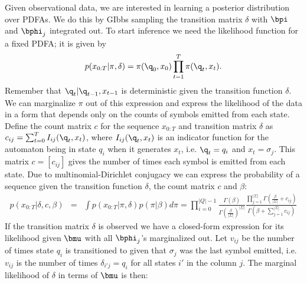 Given observational data, we are interested in learning a posterior distribution over PDFAs.  We do this by GIbbs sampling the transition matrix $\delta$ with $\bpi$ and $\bphi_j$ integrated out.  To start inference we need the likelihood function for a fixed PDFA; it is given by
%
\[ p(x_{0:T}|\pi,\delta) = \pi(\q_0,x_0)\prod_{t=1}^T \pi(\q_t,x_t) \label{x:def}. \]
%
Remember that $\q_t | \q_{t-1}, x_{t-1}$ is deterministic given the transition function $\delta$. 
We can marginalize $\pi$ out of this expression and express the likelihood of the data in a form that depends only on the counts of symbols emitted from each state.  Define the count matrix $c$ for the sequence $x_{0:T}$ and transition matrix $\delta$ as $c_{ij} = \sum_{t=0}^T I_{ij}(\q_t,x_t)$, where $I_{ij}(\q_t,x_t)$ is an indicator function for the automaton being in state $q_i$ when it generates $x_t$, i.e. $\q_t = q_i$ and $x_t = \sigma_j$. This matrix $c = [c_{ij}]$ gives the number of times each symbol is emitted from each state.  Due to multinomial-Dirichlet conjugacy we can express the probability of a sequence given the transition function $\delta$, the count matrix $c$ and $\beta$:
%
\begin{eqnarray}
 p(x_{0:T}|\delta,c,\beta) & = & \int p(x_{0:T}|\pi,\delta) p(\pi|\beta) d\pi \label{x:factor} %
= \prod_{i=0}^{|Q|-1} \frac{\Gamma(\beta)}{\Gamma(\frac{\beta}{|\Sigma|})^{|\Sigma|}} \frac{\prod_{j=1}^{|\Sigma|}\Gamma(\frac{\beta}{|\Sigma|} + c_{ij})}{\Gamma(\beta + \sum_{j=1}^{|\Sigma|} c_{ij})} \label{x:end}
 \end{eqnarray}
If the transition matrix $\delta$ is observed we have a closed-form expression for its likelihood given $\bmu$ with all $\bphi_j$'s marginalized out.  Let $v_{ij}$ be the number of times state $q_i$ is transitioned to given that $\sigma_j$ was the last symbol emitted, i.e.~$v_{ij}$ is the number of times $\delta_{i'j} = q_i$ for all states $i'$ in the column $j$. %
The marginal likelihood of $\delta$ in terms of $\bmu$ is then:
